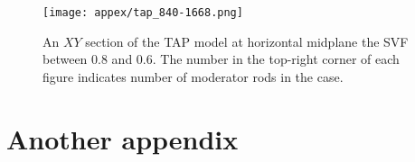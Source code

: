 \newpage
\begin{figure}[htp!] %
	\centering
	\texttt{[image: appex/tap\_840-1668.png]}
			\vspace{-3mm}
	\caption{An $XY$ section of the \gls{TAP} model at horizontal midplane the 
	\gls{SVF} between 0.8 and 0.6. The number in the top-right corner of 
	each figure indicates number of moderator rods in the case.}
	\label{fig:tap-840-1668}
\end{figure}

\chapter{Another appendix}